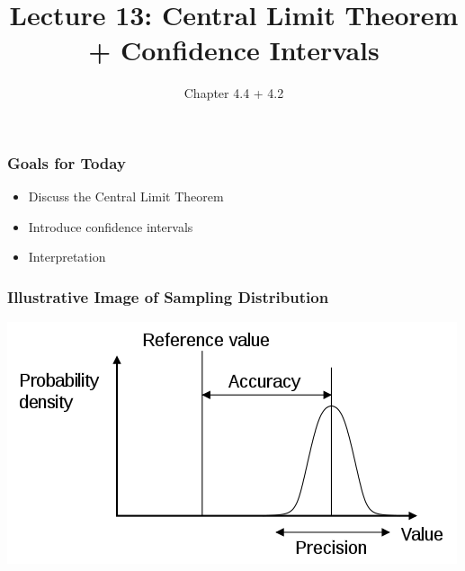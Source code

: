 \documentclass[slides]{beamer}
\title{Lecture 13: Central Limit Theorem + Confidence Intervals}
\author{Chapter 4.4 + 4.2}
\date{}
\begin{document}
\begin{frame}
\titlepage
\end{frame}


\begin{frame}[fragile]
\frametitle{Goals for Today}

\begin{itemize}
\item Discuss the Central Limit Theorem
\item Introduce confidence intervals
\item Interpretation
\end{itemize}

\end{frame}


\begin{frame}[fragile]
\frametitle{Illustrative Image of Sampling Distribution}

\begin{center}
\includegraphics[width=\textwidth]{figure/Accuracy_and_precision.png}
\end{center}

\end{frame}
\end{document}
